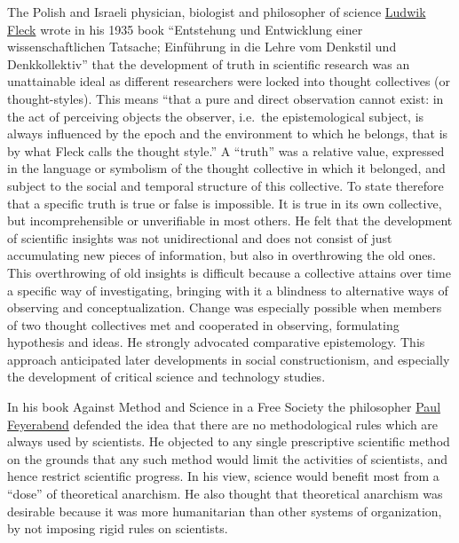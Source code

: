 \documentclass[
]{article}
\begin{document}
The Polish and Israeli physician, biologist and philosopher of science
\href{https://en.wikipedia.org/wiki/Ludwik_Fleck}{Ludwik Fleck} wrote in
his 1935 book ``Entstehung und Entwicklung einer wissenschaftlichen
Tatsache; Einführung in die Lehre vom Denkstil und Denkkollektiv'' that
the development of truth in scientific research was an unattainable
ideal as different researchers were locked into thought collectives (or
thought-styles). This means ``that a pure and direct observation cannot
exist: in the act of perceiving objects the observer, i.e.~the
epistemological subject, is always influenced by the epoch and the
environment to which he belongs, that is by what Fleck calls the thought
style.'' A ``truth'' was a relative value, expressed in the language or
symbolism of the thought collective in which it belonged, and subject to
the social and temporal structure of this collective. To state therefore
that a specific truth is true or false is impossible. It is true in its
own collective, but incomprehensible or unverifiable in most others. He
felt that the development of scientific insights was not unidirectional
and does not consist of just accumulating new pieces of information, but
also in overthrowing the old ones. This overthrowing of old insights is
difficult because a collective attains over time a specific way of
investigating, bringing with it a blindness to alternative ways of
observing and conceptualization. Change was especially possible when
members of two thought collectives met and cooperated in observing,
formulating hypothesis and ideas. He strongly advocated comparative
epistemology. This approach anticipated later developments in social
constructionism, and especially the development of critical science and
technology studies.

In his book Against Method and Science in a Free Society the philosopher
\href{https://en.wikipedia.org/wiki/Paul_Feyerabend}{Paul Feyerabend}
defended the idea that there are no methodological rules which are
always used by scientists. He objected to any single prescriptive
scientific method on the grounds that any such method would limit the
activities of scientists, and hence restrict scientific progress. In his
view, science would benefit most from a ``dose'' of theoretical
anarchism. He also thought that theoretical anarchism was desirable
because it was more humanitarian than other systems of organization, by
not imposing rigid rules on scientists.
\end{document}

